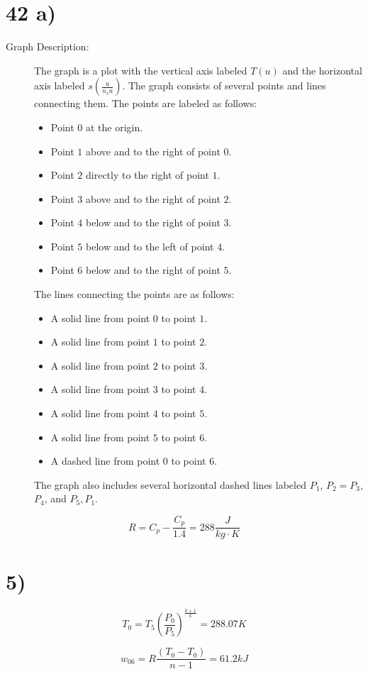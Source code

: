 \section*{42 a)}

\begin{description}
    \item[Graph Description:] The graph is a plot with the vertical axis labeled $T(u)$ and the horizontal axis labeled $s(\frac{u}{u_s u})$. The graph consists of several points and lines connecting them. The points are labeled as follows:
    \begin{itemize}
        \item Point $0$ at the origin.
        \item Point $1$ above and to the right of point $0$.
        \item Point $2$ directly to the right of point $1$.
        \item Point $3$ above and to the right of point $2$.
        \item Point $4$ below and to the right of point $3$.
        \item Point $5$ below and to the left of point $4$.
        \item Point $6$ below and to the right of point $5$.
    \end{itemize}
    The lines connecting the points are as follows:
    \begin{itemize}
        \item A solid line from point $0$ to point $1$.
        \item A solid line from point $1$ to point $2$.
        \item A solid line from point $2$ to point $3$.
        \item A solid line from point $3$ to point $4$.
        \item A solid line from point $4$ to point $5$.
        \item A solid line from point $5$ to point $6$.
        \item A dashed line from point $0$ to point $6$.
    \end{itemize}
    The graph also includes several horizontal dashed lines labeled $P_1$, $P_2 = P_3$, $P_4$, and $P_5, P_1$.
\end{description}

\[
R = C_p - \frac{C_p}{1.4} = 288 \frac{J}{kg \cdot K}
\]

\section*{5)}

\[
T_0 = T_5 \left( \frac{P_0}{P_5} \right)^{\frac{k+1}{k}} = 288.07 K
\]

\[
w_{06} = R \frac{(T_0 - T_0)}{n-1} = 61.2 kJ
\]